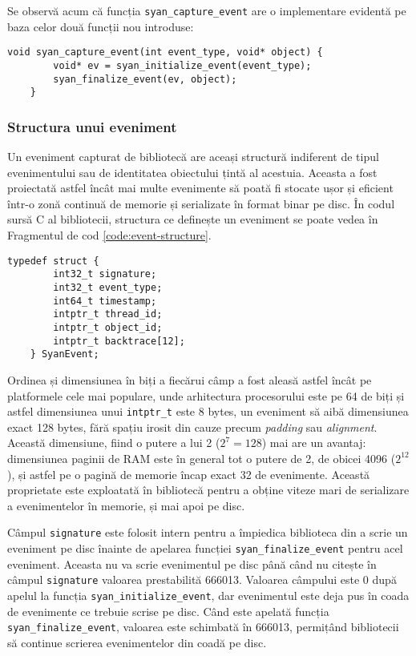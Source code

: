 Se observă acum că funcția \lstinline{syan_capture_event} are o
implementare evidentă pe baza celor două funcții nou introduse:
\begin{lstlisting}[caption=Implementarea funcției
                   \lstinline{syan_capture_event}]
    void syan_capture_event(int event_type, void* object) {
        void* ev = syan_initialize_event(event_type);
        syan_finalize_event(ev, object);
    }
\end{lstlisting}

\subsubsection{Structura unui eveniment}\label{section:event-structure}

Un eveniment capturat de bibliotecă are aceași structură indiferent de
tipul evenimentului sau de identitatea obiectului țintă al acestuia.
Aceasta a fost proiectată astfel încât mai multe evenimente să poată fi
stocate ușor și eficient într-o zonă continuă de memorie și serializate
în format binar pe disc. În codul sursă C al bibliotecii, structura ce
definește un eveniment se poate vedea în Fragmentul de cod
\ref{code:event-structure}.
\begin{lstlisting}[caption=Structura unui eveniment capturat,
                   label=code:event-structure, float, floatplacement=H]
    typedef struct {
        int32_t signature;
        int32_t event_type;
        int64_t timestamp;
        intptr_t thread_id;
        intptr_t object_id;
        intptr_t backtrace[12];
    } SyanEvent;
\end{lstlisting}

Ordinea și dimensiunea în biți a fiecărui câmp a fost aleasă astfel
încât pe platformele cele mai populare, unde arhitectura procesorului
este pe 64 de biți și astfel dimensiunea unui \lstinline{intptr_t} este
8 bytes, un eveniment să aibă dimensiunea exact 128 bytes, fără spațiu
irosit din cauze precum \textit{padding} sau \textit{alignment}. Această
dimensiune, fiind o putere a lui 2 ($2^7=128$) mai are un avantaj:
dimensiunea paginii de RAM este în general tot o putere de 2, de obicei
4096 ($2^{12}$), și astfel pe o pagină de memorie încap exact 32 de
evenimente. Această proprietate este exploatată în bibliotecă pentru a
obține viteze mari de serializare a evenimentelor în memorie, și mai
apoi pe disc.

Câmpul \lstinline{signature} este folosit intern pentru a împiedica
biblioteca din a scrie un eveniment pe disc înainte de apelarea funcției
\lstinline{syan_finalize_event} pentru acel eveniment. Aceasta nu va
scrie evenimentul pe disc până când nu citește în câmpul
\lstinline{signature} valoarea prestabilită 666013. Valoarea câmpului
este 0 după apelul la funcția \lstinline{syan_initialize_event}, dar
evenimentul este deja pus în coada de evenimente ce trebuie scrise pe
disc. Când este apelată funcția \lstinline{syan_finalize_event},
valoarea este schimbată în 666013, permițând bibliotecii să continue
scrierea evenimentelor din coadă pe disc.

